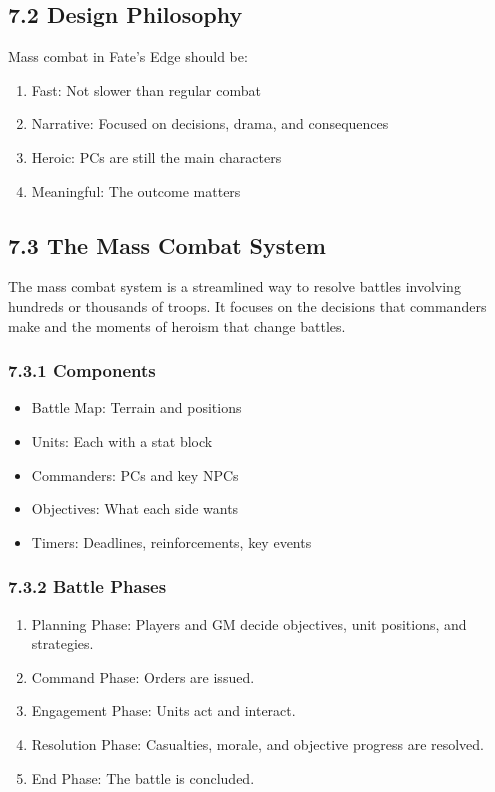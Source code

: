 \documentclass[11pt]{article}
\begin{document}
\subsection{7.2 Design Philosophy}

Mass combat in Fate's Edge should be:
\begin{enumerate}
  \item Fast: Not slower than regular combat
  \item Narrative: Focused on decisions, drama, and consequences
  \item Heroic: PCs are still the main characters
  \item Meaningful: The outcome matters
\end{enumerate}

\subsection{7.3 The Mass Combat System}

The mass combat system is a streamlined way to resolve battles involving hundreds or thousands of troops. It focuses on the decisions that commanders make and the moments of heroism that change battles.

\subsubsection{7.3.1 Components}

\begin{itemize}
  \item Battle Map: Terrain and positions
  \item Units: Each with a stat block
  \item Commanders: PCs and key NPCs
  \item Objectives: What each side wants
  \item Timers: Deadlines, reinforcements, key events
\end{itemize}

\subsubsection{7.3.2 Battle Phases}

\begin{enumerate}
  \item Planning Phase: Players and GM decide objectives, unit positions, and strategies.
  \item Command Phase: Orders are issued.
  \item Engagement Phase: Units act and interact.
  \item Resolution Phase: Casualties, morale, and objective progress are resolved.
  \item End Phase: The battle is concluded.
\end{enumerate}
\end{document}
